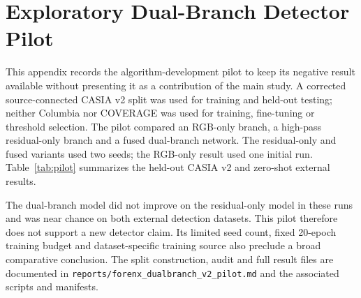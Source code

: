 \appendix
\section{Exploratory Dual-Branch Detector Pilot}
\setcounter{table}{0}
\renewcommand{\thetable}{S\arabic{table}}
\renewcommand{\theHtable}{S\arabic{table}}
This appendix records the algorithm-development pilot to keep its negative result available without presenting it as a contribution of the main study. A corrected source-connected CASIA v2 split was used for training and held-out testing; neither Columbia nor COVERAGE was used for training, fine-tuning or threshold selection. The pilot compared an RGB-only branch, a high-pass residual-only branch and a fused dual-branch network. The residual-only and fused variants used two seeds; the RGB-only result used one initial run. Table~\ref{tab:pilot} summarizes the held-out CASIA v2 and zero-shot external results.

\begin{table}[h]
\centering
\caption{Exploratory dual-branch pilot results (mean $\pm$ sample SD for two-seed variants). AUC is image-level detection; F1 is pixel-level localization. Columbia localization is omitted because its annotation has boundary/source-region semantics.}
\label{tab:pilot}
\small
{}
\end{table}

The dual-branch model did not improve on the residual-only model in these runs and was near chance on both external detection datasets. This pilot therefore does not support a new detector claim. Its limited seed count, fixed 20-epoch training budget and dataset-specific training source also preclude a broad comparative conclusion. The split construction, audit and full result files are documented in \texttt{reports/forenx\_dualbranch\_v2\_pilot.md} and the associated scripts and manifests.

